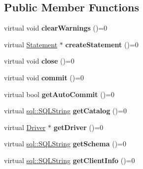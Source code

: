 \subsection*{Public Member Functions}
\begin{DoxyCompactItemize}
\item 
\hypertarget{classsql_1_1_connection_adc7b9f8ebed556481f207cb251bfeb06}{}\label{classsql_1_1_connection_adc7b9f8ebed556481f207cb251bfeb06} 
virtual void {\bfseries clear\+Warnings} ()=0
\item 
\hypertarget{classsql_1_1_connection_aa233877114405e5392ea2d2361e0a15c}{}\label{classsql_1_1_connection_aa233877114405e5392ea2d2361e0a15c} 
virtual \hyperlink{classsql_1_1_statement}{Statement} $\ast$ {\bfseries create\+Statement} ()=0
\item 
\hypertarget{classsql_1_1_connection_ad2c949835acad775c52e35f3a4fc5c13}{}\label{classsql_1_1_connection_ad2c949835acad775c52e35f3a4fc5c13} 
virtual void {\bfseries close} ()=0
\item 
\hypertarget{classsql_1_1_connection_a6bea21812167998e6f492f8471e19003}{}\label{classsql_1_1_connection_a6bea21812167998e6f492f8471e19003} 
virtual void {\bfseries commit} ()=0
\item 
\hypertarget{classsql_1_1_connection_a0e5f22278356c25f85e4d3d18f6e2493}{}\label{classsql_1_1_connection_a0e5f22278356c25f85e4d3d18f6e2493} 
virtual bool {\bfseries get\+Auto\+Commit} ()=0
\item 
\hypertarget{classsql_1_1_connection_a55ecebee6958e648bdb2362f80f2e7ea}{}\label{classsql_1_1_connection_a55ecebee6958e648bdb2362f80f2e7ea} 
virtual \hyperlink{classsql_1_1_s_q_l_string}{sql\+::\+S\+Q\+L\+String} {\bfseries get\+Catalog} ()=0
\item 
\hypertarget{classsql_1_1_connection_a7556b7f419baca4d3376382cd1257903}{}\label{classsql_1_1_connection_a7556b7f419baca4d3376382cd1257903} 
virtual \hyperlink{classsql_1_1_driver}{Driver} $\ast$ {\bfseries get\+Driver} ()=0
\item 
\hypertarget{classsql_1_1_connection_a74640969453950f6f616fe3761507609}{}\label{classsql_1_1_connection_a74640969453950f6f616fe3761507609} 
virtual \hyperlink{classsql_1_1_s_q_l_string}{sql\+::\+S\+Q\+L\+String} {\bfseries get\+Schema} ()=0
\item 
\hypertarget{classsql_1_1_connection_a0d4a70af09c4bf98409da46bc2e774d3}{}\label{classsql_1_1_connection_a0d4a70af09c4bf98409da46bc2e774d3} 
virtual \hyperlink{classsql_1_1_s_q_l_string}{sql\+::\+S\+Q\+L\+String} {\bfseries get\+Client\+Info} ()=0

\end{DoxyCompactItemize}
